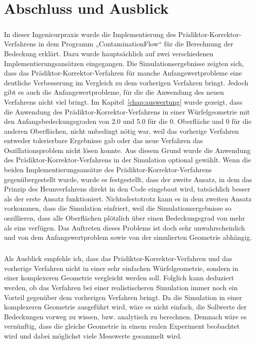 \documentclass{listhesis}
\begin{document}

\chapter{Abschluss und Ausblick} \label{chap:abschluss}
\paragraph{}
In dieser Ingenieurpraxis wurde die Implementierung des Prädiktor-Korrektor-Verfahrens in dem Programm „ContaminationFlow“ für die Berechnung der Bedeckung erklärt. Dazu wurde hauptsächlich auf zwei verschiedenen Implementierungsansätzen eingegangen. Die Simulationsergebnisse zeigten sich, dass das Prädiktor-Korrektor-Verfahren für manche Anfangswertprobleme eine deutliche Verbesserung im Vergleich zu dem vorherigen Verfahren bringt. Jedoch gibt es auch die Anfangswertprobleme, für die die Anwendung des neuen Verfahrens nicht viel bringt. Im Kapitel~\ref{chap:auswertung} wurde gezeigt, dass die Anwendung des Prädiktor-Korrektor-Verfahrens in einer Würfelgeometrie mit den Anfangsbedeckungsgraden von 2.0 und 5.0 für die  0. Oberfläche und 0 für die anderen Oberflächen, nicht unbedingt nötig war, weil das vorherige Verfahren entweder tolerierbare Ergebnisse gab oder das neue Verfahren das Oszillationsproblem nicht lösen konnte. Aus diesem Grund wurde die Anwendung des Prädiktor-Korrektor-Verfahrens in der Simulation optional gewählt. Wenn die beiden Implementierungsansätze des Prädiktor-Korrektor-Verfahrens gegenübergestellt wurde, wurde es festgestellt, dass der zweite Ansatz, in dem das Prinzip des Heunverfahrens direkt in den Code eingebaut wird, tatsächlich besser als der erste Ansatz funktioniert. Nichtsdestotrotz kann es in dem zweiten Ansatz vorkommen, dass die Simulation einfriert, weil die Simulationsergebnisse so oszillieren, dass alle Oberflächen plötzlich über einen Bedeckungsgrad von mehr als eins verfügen. Das Auftreten dieses Problems ist doch sehr unwahrscheinlich und von dem Anfangswertproblem sowie von der simulierten Geometrie abhängig.
 
\paragraph{}
Als Ausblick empfehle ich, dass das Prädiktor-Korrektor-Verfahren und das vorherige Verfahren nicht in einer sehr einfachen Würfelgeometrie, sondern in einer komplexeren Geometrie vergleicht werden soll. Folglich kann deduziert werden, ob das Verfahren bei einer realistischeren Simulation immer noch ein Vorteil gegenüber dem vorherigen Verfahren bringt. Da die Simulation in einer komplexeren Geometrie ausgeführt wird, wäre es nicht einfach, die Sollwerte der Bedeckungen vorweg zu wissen, bzw. analytisch zu berechnen. Demnach wäre es vernünftig, dass die gleiche Geometrie in einem realen Experiment beobachtet wird und dabei möglichst viele 	Messwerte gesammelt wird.


\cleardoublepage



\confirmation
\end{document}

